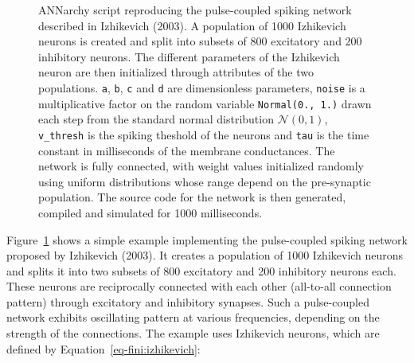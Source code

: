\documentclass[
  11pt,
  a4paper,
]{scrbook}
\begin{document}
\begin{figure}


\caption{\label{fig-fini:izhikevich}ANNarchy script reproducing the
pulse-coupled spiking network described in Izhikevich (2003). A
population of 1000 Izhikevich neurons is created and split into subsets
of 800 excitatory and 200 inhibitory neurons. The different parameters
of the Izhikevich neuron are then initialized through attributes of the
two populations. \texttt{a}, \texttt{b}, \texttt{c} and \texttt{d} are
dimensionless parameters, \texttt{noise} is a multiplicative factor on
the random variable \texttt{Normal(0.,\ 1.)} drawn each step from the
standard normal distribution \(\mathcal{N}(0,1)\), \texttt{v\_thresh} is
the spiking theshold of the neurons and \texttt{tau} is the time
constant in milliseconds of the membrane conductances. The network is
fully connected, with weight values initialized randomly using uniform
distributions whose range depend on the pre-synaptic population. The
source code for the network is then generated, compiled and simulated
for 1000 milliseconds.}

\end{figure}%

Figure~\ref{fig-fini:izhikevich} shows a simple example implementing the
pulse-coupled spiking network proposed by Izhikevich (2003). It creates
a population of 1000 Izhikevich neurons and splits it into two subsets
of 800 excitatory and 200 inhibitory neurons each. These neurons are
reciprocally connected with each other (all-to-all connection pattern)
through excitatory and inhibitory synapses. Such a pulse-coupled network
exhibits oscillating pattern at various frequencies, depending on the
strength of the connections. The example uses Izhikevich neurons, which
are defined by Equation~\ref{eq-fini:izhikevich}:
\end{document}
